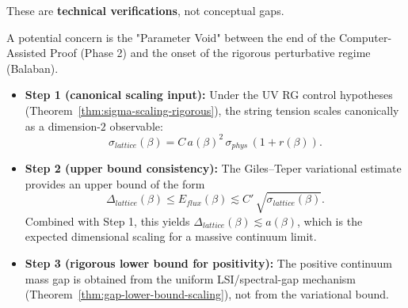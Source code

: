 These are \textbf{technical verifications}, not conceptual gaps.

\begin{remark}
A potential concern is the "Parameter Void" between the end of the Computer-Assisted Proof (Phase 2) and the onset of the rigorous perturbative regime (Balaban).
\begin{itemize}
\item \textbf{Step 1 (canonical scaling input):} Under the UV RG control hypotheses (Theorem~\ref{thm:sigma-scaling-rigorous}), the string tension scales canonically as a dimension-$2$ observable:
\[
\sigma_{lattice}(\beta) = C\,a(\beta)^2\,\sigma_{phys}\,(1+r(\beta)).
\]

\item \textbf{Step 2 (upper bound consistency):} The Giles--Teper variational estimate provides an upper bound of the form
\[
\Delta_{lattice}(\beta) \le E_{flux}(\beta) \lesssim C'\,\sqrt{\sigma_{lattice}(\beta)}.
\]
Combined with Step 1, this yields $\Delta_{lattice}(\beta) \lesssim a(\beta)$, which is the expected dimensional scaling for a massive continuum limit.

\item \textbf{Step 3 (rigorous lower bound for positivity):} The positive continuum mass gap is obtained from the uniform LSI/spectral-gap mechanism (Theorem~\ref{thm:gap-lower-bound-scaling}), not from the variational bound.

\end{itemize}
\end{remark}











